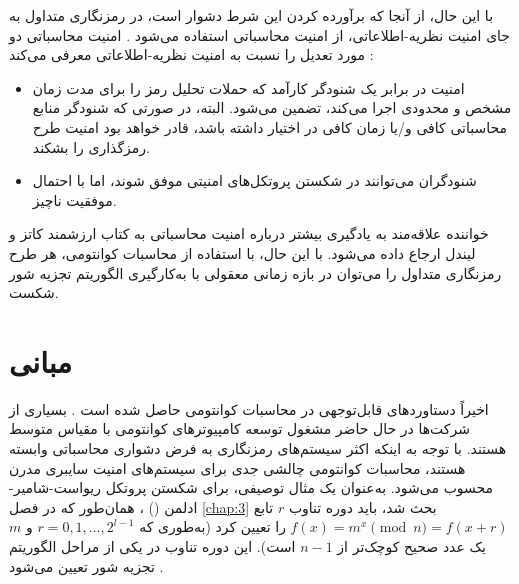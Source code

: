 با این حال، از آنجا که برآورده کردن این شرط دشوار است، در رمزنگاری متداول به جای امنیت نظریه-اطلاعاتی، از امنیت محاسباتی استفاده می‌شود \cite{7-1, 7-3, 7-7, 7-10, 7-11, 7-12}. امنیت محاسباتی دو مورد تعدیل را نسبت به امنیت نظریه-اطلاعاتی معرفی می‌کند \cite{7-3}:










\begin{itemize}
	\item امنیت در برابر یک شنودگر کارآمد که حملات تحلیل رمز را برای مدت زمان مشخص و محدودی اجرا می‌کند، تضمین می‌شود. البته، در صورتی که شنودگر منابع محاسباتی کافی و/یا زمان کافی در اختیار داشته باشد، قادر خواهد بود امنیت طرح رمزگذاری را بشکند.
	\item شنودگران می‌توانند در شکستن پروتکل‌های امنیتی موفق شوند، اما با احتمال موفقیت ناچیز.
\end{itemize}
خواننده علاقه‌مند به یادگیری بیشتر درباره امنیت محاسباتی به کتاب ارزشمند کاتز و لیندل \cite{7-3} ارجاع داده می‌شود. با این حال، با استفاده از محاسبات کوانتومی، هر طرح رمزنگاری متداول را می‌توان در بازه زمانی معقولی با به‌کارگیری الگوریتم تجزیه شور \cite{7-13, 7-14, 7-15, 7-16, 7-17} شکست.

\section{مبانی }
\label{sec:7-2}
اخیراً دستاوردهای قابل‌توجهی در محاسبات کوانتومی حاصل شده است \cite{7-6, 7-7, 7-8}. بسیاری از شرکت‌ها در حال حاضر مشغول توسعه کامپیوترهای کوانتومی با مقیاس متوسط هستند. با توجه به اینکه اکثر سیستم‌های رمزنگاری به فرض دشواری محاسباتی وابسته هستند، محاسبات کوانتومی چالشی جدی برای سیستم‌های امنیت سایبری مدرن محسوب می‌شود. به‌عنوان یک مثال توصیفی، برای شکستن پروتکل ریواست-شامیر-ادلمن () \cite{7-18}، همان‌طور که در فصل \ref{chap:3} بحث شد، باید دوره تناوب $r$ تابع $f(x) = m^x \pmod n = f(x+r)$ را تعیین کرد (به‌طوری که $r = 0, 1, \dots, 2^{l-1}$ و $m$ یک عدد صحیح کوچک‌تر از $n-1$ است). این دوره تناوب در یکی از مراحل الگوریتم تجزیه شور تعیین می‌شود \cite{7-6, 7-7, 7-8, 7-15, 7-16, 7-17}.








